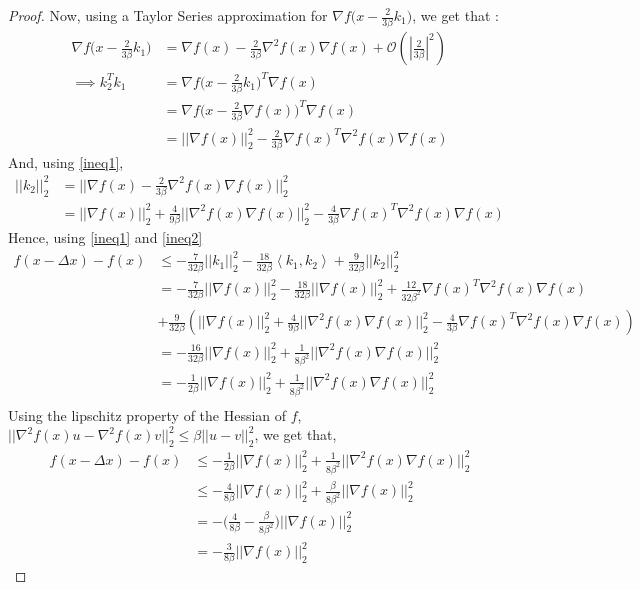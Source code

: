 \documentclass[12pt,twoside]{article}
\begin{document}
\begin{proof}
Now, using a Taylor Series approximation for $\nabla f \big( x - \frac{2}{3\beta}k_1 \big)$, we get that :
\begin{equation}
\begin{aligned}\label{ineq1}
\nabla f \big( x - \frac{2}{3\beta}k_1 \big) &= \nabla f(x) - \frac{2}{3\beta} \nabla^2 f(x) \nabla f(x) + \mathcal{O}( |\frac{2}{3\beta} |^2 ) \\
\implies  k_2^Tk_1 &= \nabla f \big( x - \frac{2}{3\beta}k_1 \big)^T\nabla f(x) \\
 &= \nabla f \big( x - \frac{2}{3\beta}\nabla f(x) \big)^T \nabla f(x) \\
&= || \nabla f(x) ||_2^2 - \frac{2}{3 \beta} \nabla f(x)^T \nabla^2 f(x) \nabla f(x)
\end{aligned}
\end{equation}
And, using \eqref{ineq1},
\begin{equation}
\begin{aligned} \label{ineq2}
|| k_2 ||_2^2 &= ||  \nabla f(x) - \frac{2}{3\beta} \nabla^2 f(x) \nabla f(x)  ||_2^2   \\
&= || \nabla f(x)||_2^2 + \frac{4}{9\beta}||\nabla^2 f(x) \nabla f(x)  ||_2^2 - \frac{4}{3\beta} \nabla f(x)^T \nabla^2 f(x) \nabla f(x)
\end{aligned}
\end{equation}
Hence, using \eqref{ineq1} and \eqref{ineq2}
\begin{align*}
f(x - \Delta x) - f(x) & \leq  -\frac{7}{32 \beta}|| k_1 ||_2^2 - \frac{18}{32 \beta} \left\langle k_1, k_2 \right\rangle + \frac{9}{32 \beta}|| k_2 ||_2^2 \\
&= -\frac{7}{32 \beta}|| \nabla f(x) ||_2^2 -  \frac{18}{32 \beta} || \nabla f(x) ||_2^2 + \frac{12}{32 \beta^2} \nabla f(x)^T \nabla^2 f(x) \nabla f(x) \\
&+  \frac{9}{32\beta}( || \nabla f(x)||_2^2 + \frac{4}{9\beta}||\nabla^2 f(x) \nabla f(x)  ||_2^2 - \frac{4}{3\beta} \nabla f(x)^T \nabla^2 f(x) \nabla f(x) )  \\
&= -\frac{16}{32 \beta}|| \nabla f(x)||_2^2 + \frac{1}{8 \beta^2}||\nabla^2 f(x) \nabla f(x)  ||_2^2 \\
&= -\frac{1}{2\beta} || \nabla f(x)||_2^2 + \frac{1}{8 \beta^2}||\nabla^2 f(x) \nabla f(x)  ||_2^2 \\
\end{align*}
Using the lipschitz property of the Hessian of $f$, $||\nabla^2 f(x) u - \nabla^2 f(x) v||_2^2 \leq \beta || u-v ||_2^2 $, we get that,
\begin{equation}
\begin{aligned}
f(x - \Delta x) - f(x) & \leq -\frac{1}{2\beta} || \nabla f(x)||_2^2 + \frac{1}{8 \beta^2}||\nabla^2 f(x) \nabla f(x)  ||_2^2 \\
& \leq -\frac{4}{8\beta}|| \nabla f(x) ||_2^2 + \frac{\beta}{8 \beta^2}|| \nabla f(x) ||_2^2 \\
& = -\big( \frac{4}{8\beta} - \frac{\beta}{8\beta^2}   \big)  || \nabla f(x) ||_2^2  \\
&= -\frac{3}{8\beta} || \nabla f(x) ||_2^2
\end{aligned}
\end{equation}
\end{proof}
\end{document}
